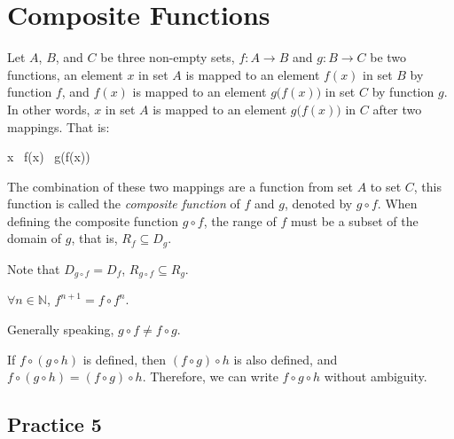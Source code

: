 \documentclass[12pt]{report}
\begin{document}
\newpage

\section{Composite Functions}

Let $A$, $B$, and $C$ be three non-empty sets, $f: A \to B$ and $g: B \to C$ be
two functions, an element $x$ in set $A$ is mapped to an element $f(x)$ in set
$B$ by function $f$, and $f(x)$ is mapped to an element $g\big(f(x)\big)$ in
set $C$ by function $g$. In other words, $x$ in set $A$ is mapped to an element
$g\big(f(x)\big)$ in $C$ after two mappings. That is:
\begin{cequation}
  x\  f(x)\  g\big(f(x)\big)
\end{cequation}

The combination of these two mappings are a function from set $A$ to set $C$,
this function is called the \emph{composite function} of $f$ and $g$, denoted
by $g \circ f$. When defining the composite function $g \circ f$, the range of
$f$ must be a subset of the domain of $g$, that is, $R_f \subseteq D_g$.

Note that $D_{g \circ f} = D_f$, $R_{g \circ f} \subseteq R_g$.

$\forall n \in \mathbb{N}$, $f^{n+1} = f \circ f^n$.

Generally speaking, $g \circ f \neq f \circ g$.

If $f \circ (g \circ h)$ is defined, then $(f \circ g) \circ h$ is also
defined, and $f \circ (g \circ h) = (f \circ g) \circ h$. Therefore, we can
write $f \circ g \circ h$ without ambiguity.

\subsection*{Practice 5}
\end{document}
